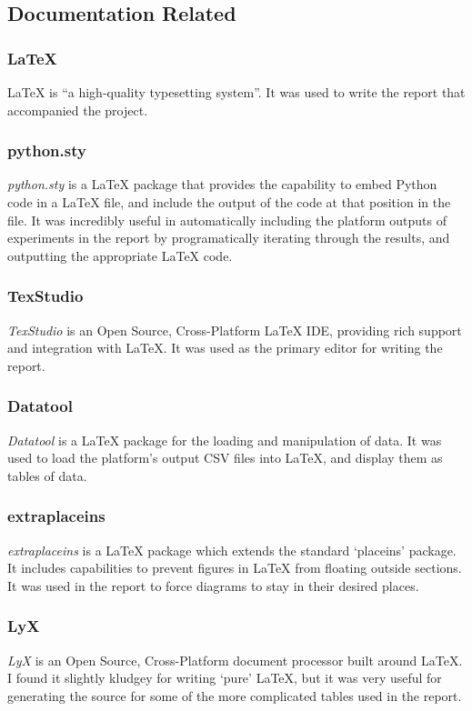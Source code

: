 \documentclass[a4paper,11pt]{report}
\begin{document}
\subsection{Documentation Related}

\subsubsection*{\LaTeX{}}
\LaTeX{} \citep{prog:latex} is ``a high-quality typesetting system''. It was used to write the report that accompanied the project.

\subsubsection*{python.sty}
\emph{python.sty} \citep{prog:pythonsty} is a \LaTeX{} package that provides the capability to embed Python code in a \LaTeX{} file, and include the output of the code at that position in the file. It was incredibly useful in automatically including the platform outputs of experiments in the report by programatically iterating through the results, and outputting the appropriate \LaTeX{} code.

\subsubsection*{TexStudio}
\emph{TexStudio} \citep{prog:texstudio} is an Open Source, Cross-Platform \LaTeX{} IDE, providing rich support and integration with \LaTeX{}. It was used as the primary editor for writing the report.

\subsubsection*{Datatool}
\emph{Datatool} \citep{prog:datatool} is a \LaTeX{} package for the loading and manipulation of data. It was used to load the platform's output CSV files into \LaTeX{}, and display them as tables of data.

\subsubsection*{extraplaceins}
\emph{extraplaceins} \citep{prog:extraplaceins} is a \LaTeX{} package which extends the standard `placeins' package. It includes capabilities to prevent figures in \LaTeX{} from floating outside sections. It was used in the report to force diagrams to stay in their desired places.

\subsubsection*{LyX}
\emph{LyX} \citep{prog:lyx} is an Open Source, Cross-Platform document processor built around \LaTeX{}. I found it slightly kludgey for writing `pure' \LaTeX{}, but it was very useful for generating the source for some of the more complicated tables used in the report. 
\end{document}
